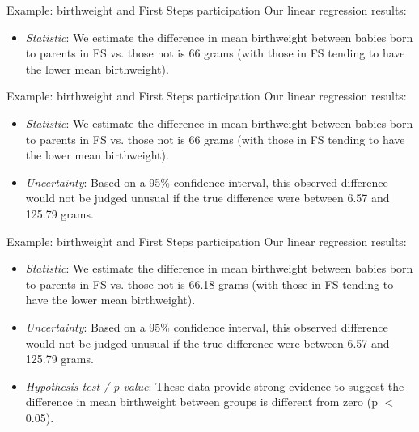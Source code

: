 \documentclass[10pt,t]{beamer}
\begin{document}
\begin{frame}{Example: birthweight and First Steps participation}
Our linear regression results:

\vspace{0.3cm}

\begin{itemize}
	\item \textit{Statistic}: We estimate the difference in mean birthweight between babies born to parents in FS vs. those not is 66 grams (with those in FS tending to have the lower mean birthweight).
\end{itemize}
\end{frame}

\begin{frame}{Example: birthweight and First Steps participation}
Our linear regression results:

\vspace{0.3cm}

\begin{itemize}
	\item \textit{Statistic}: We estimate the difference in mean birthweight between babies born to parents in FS vs. those not is 66 grams (with those in FS tending to have the lower mean birthweight).
	\item \textit{Uncertainty}: Based on a 95\% confidence interval, this observed difference would not be judged unusual if the true difference were between 6.57 and 125.79 grams.
\end{itemize}
\end{frame}

\begin{frame}{Example: birthweight and First Steps participation}
Our linear regression results:

\vspace{0.3cm}

\begin{itemize}
	\item \textit{Statistic}: We estimate the difference in mean birthweight between babies born to parents in FS vs. those not is 66.18 grams (with those in FS tending to have the lower mean birthweight).
	\item \textit{Uncertainty}: Based on a 95\% confidence interval, this observed difference would not be judged unusual if the true difference were between 6.57 and 125.79 grams.
	\item \textit{Hypothesis test / p-value}: These data provide strong evidence to suggest the difference in mean birthweight between groups is different from zero (p $<$ 0.05).
\end{itemize}
\end{frame}
\end{document}
